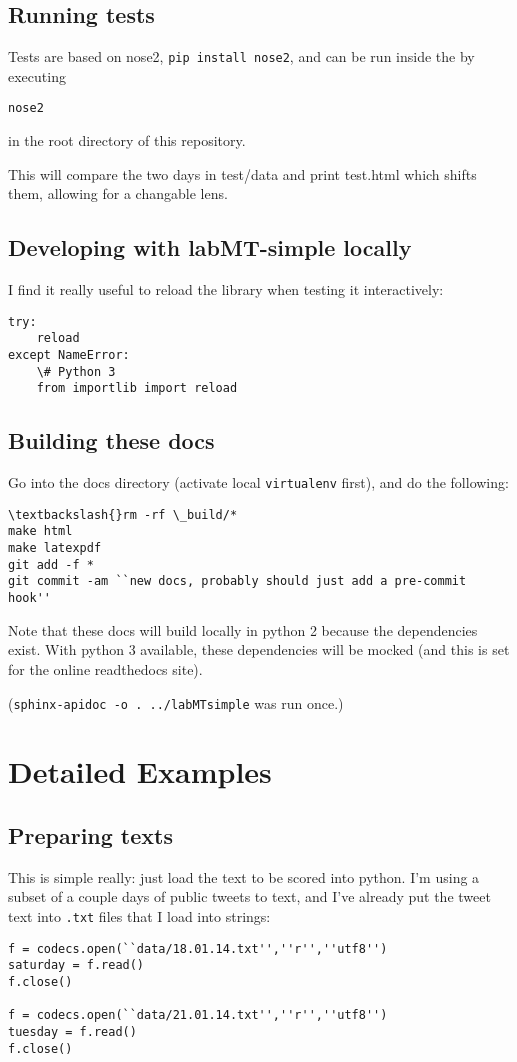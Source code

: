 \subsection{Running tests}
\label{getting-started:running-tests}
Tests are based on nose2, \lstinline{pip install nose2}, and can be run inside the by executing
\begin{lstlisting}
nose2
\end{lstlisting}

in the root directory of this repository.

This will compare the two days in test/data and print test.html which shifts them, allowing for a changable lens.


\subsection{Developing with labMT-simple locally}
\label{getting-started:developing-with-labmt-simple-locally}
I find it really useful to reload the library when testing it interactively:
\begin{lstlisting}
try:
    reload
except NameError:
    \# Python 3
    from importlib import reload
\end{lstlisting}


\subsection{Building these docs}
\label{getting-started:building-these-docs}
Go into the docs directory (activate local \lstinline{virtualenv} first), and do the following:
\begin{lstlisting}
\textbackslash{}rm -rf \_build/*
make html
make latexpdf
git add -f *
git commit -am ``new docs, probably should just add a pre-commit hook''
\end{lstlisting}

Note that these docs will build locally in python 2 because the dependencies exist.
With python 3 available, these dependencies will be mocked (and this is set for the online readthedocs site).

(\lstinline{sphinx-apidoc -o . ../labMTsimple} was run once.)


\section{Detailed Examples}
\label{detailed-example::doc}\label{detailed-example:detailed-examples}

\subsection{Preparing texts}
\label{detailed-example:preparing-texts}
This is simple really: just load the text to be scored into python.
I'm using a subset of a couple days of public tweets to text, and I've already put the tweet text into \lstinline{.txt} files that I load into strings:
\begin{lstlisting}
f = codecs.open(``data/18.01.14.txt'',''r'',''utf8'')
saturday = f.read()
f.close()

f = codecs.open(``data/21.01.14.txt'',''r'',''utf8'')
tuesday = f.read()
f.close()
\end{lstlisting}


